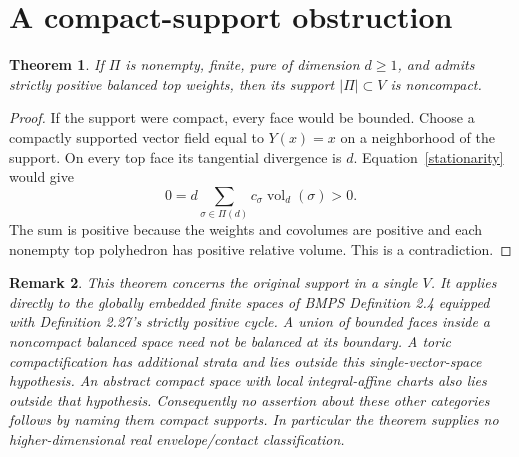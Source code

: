 \documentclass[11pt]{article}
\newtheorem{theorem}{Theorem}
\newtheorem{remark}[theorem]{Remark}
\newcommand{\vol}{\operatorname{vol}}
\begin{document}
\section{A compact-support obstruction}
\begin{theorem}\label{noncompact}
If $\Pi$ is nonempty, finite, pure of dimension $d\geq1$, and admits strictly positive balanced top weights, then its support $|\Pi|\subset V$ is noncompact.
\end{theorem}
\begin{proof}
If the support were compact, every face would be bounded. Choose a compactly supported vector field equal to $Y(x)=x$ on a neighborhood of the support. On every top face its tangential divergence is $d$. Equation~\eqref{stationarity} would give
\[0=d\sum_{\sigma\in\Pi(d)}c_\sigma\vol_d(\sigma)>0.
\]
The sum is positive because the weights and covolumes are positive and each nonempty top polyhedron has positive relative volume. This is a contradiction.
\end{proof}

\begin{remark}\label{scope}
This theorem concerns the original support in a single $V$. It applies directly to the globally embedded finite spaces of BMPS Definition 2.4 equipped with Definition 2.27's strictly positive cycle. A union of bounded faces inside a noncompact balanced space need not be balanced at its boundary. A toric compactification has additional strata and lies outside this single-vector-space hypothesis. An abstract compact space with local integral-affine charts also lies outside that hypothesis. Consequently no assertion about these other categories follows by naming them compact supports. In particular the theorem supplies no higher-dimensional real envelope/contact classification.
\end{remark}
\end{document}
